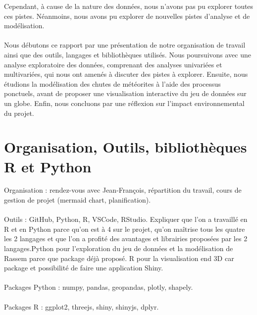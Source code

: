 \documentclass[12pt]{article}
\begin{document}
Cependant, à cause de la nature des données, nous n'avons pas pu explorer toutes ces pistes. Néanmoins, nous avons pu explorer de nouvelles pistes d'analyse et de modélisation.\\
\\
Nous débutons ce rapport par une présentation de notre organisation de travail ainsi que des outils, langages et bibliothèques utilisés. Nous poursuivons avec une analyse exploratoire des données, comprenant des analyses univariées et multivariées, qui nous ont amenés à discuter des pistes à explorer. Ensuite, nous étudions la modélisation des chutes de météorites à l'aide des processus ponctuels, avant de proposer une visualisation interactive du jeu de données sur un globe. Enfin, nous concluons par une réflexion sur l'impact environnemental du projet.\\
\newpage
\section{Organisation, Outils, bibliothèques R et Python}
Organisation : rendez-vous avec Jean-François, répartition du travail, cours de gestion de projet (mermaid chart, planification).\\
\\
Outils : GitHub, Python, R, VSCode, RStudio. Expliquer que l'on a travaillé en R et en Python parce qu'on est à 4 sur le projet, qu'on maîtrise tous les quatre les 2 langages et que l'on a profité des avantages et librairies proposées par les 2 langages.Python pour l'exploration du jeu de données et la modélisation de Rassem parce que package déjà proposé. R pour la visualisation end 3D car package et possibilité de faire une application Shiny.\\
\\
Packages Python : numpy, pandas, geopandas, plotly, shapely.\\
\\
Packages R : ggplot2, threejs, shiny, shinyjs, dplyr.\\ 
\\
\end{document}
